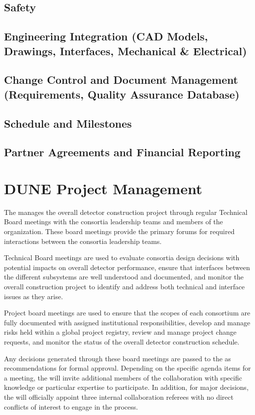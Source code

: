 \subsection{Safety}
\subsection{Engineering Integration (CAD Models, Drawings, Interfaces, Mechanical \& Electrical)}
\subsection{Change Control and Document Management (Requirements, Quality Assurance Database)}
\subsection{Schedule and Milestones}
\subsection{Partner Agreements and Financial Reporting}

\section{DUNE Project Management}
\label{sec:pm}



The  manages the overall detector construction project
through regular Technical Board meetings with the consortia leadership
teams and members of the  organization.  These board
meetings provide the primary forums for required interactions between
the consortia leadership teams.

Technical Board meetings are used to evaluate consortia design
decisions with potential impacts on overall detector performance,
ensure that interfaces between the different subsystems are well
understood and documented, and monitor the overall construction
project to identify and address both technical and interface issues as
they arise.

Project board meetings are used to ensure that the scopes of each
consortium are fully documented with assigned institutional
responsibilities, develop and manage risks held within a global
project registry, review and manage project change requests, and
monitor the status of the overall detector construction schedule.

Any decisions generated through these board meetings are passed to the
  as recommendations for formal approval.
Depending on the specific agenda items for a meeting, the
 will invite additional members of the collaboration
with specific knowledge or particular expertise to participate.  In
addition, for major decisions, the  will officially
appoint three internal collaboration referees with no direct conflicts
of interest to engage in the process.
